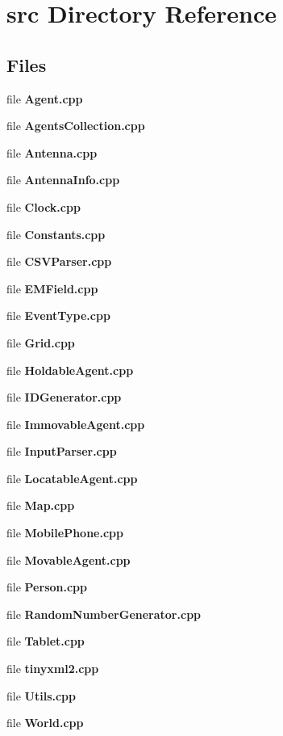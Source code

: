 \section{src Directory Reference}
\label{dir_68267d1309a1af8e8297ef4c3efbcdba}
\subsection*{Files}
\begin{DoxyCompactItemize}
\item 
file \textbf{ Agent.\+cpp}
\item 
file \textbf{ Agents\+Collection.\+cpp}
\item 
file \textbf{ Antenna.\+cpp}
\item 
file \textbf{ Antenna\+Info.\+cpp}
\item 
file \textbf{ Clock.\+cpp}
\item 
file \textbf{ Constants.\+cpp}
\item 
file \textbf{ C\+S\+V\+Parser.\+cpp}
\item 
file \textbf{ E\+M\+Field.\+cpp}
\item 
file \textbf{ Event\+Type.\+cpp}
\item 
file \textbf{ Grid.\+cpp}
\item 
file \textbf{ Holdable\+Agent.\+cpp}
\item 
file \textbf{ I\+D\+Generator.\+cpp}
\item 
file \textbf{ Immovable\+Agent.\+cpp}
\item 
file \textbf{ Input\+Parser.\+cpp}
\item 
file \textbf{ Locatable\+Agent.\+cpp}
\item 
file \textbf{ Map.\+cpp}
\item 
file \textbf{ Mobile\+Phone.\+cpp}
\item 
file \textbf{ Movable\+Agent.\+cpp}
\item 
file \textbf{ Person.\+cpp}
\item 
file \textbf{ Random\+Number\+Generator.\+cpp}
\item 
file \textbf{ Tablet.\+cpp}
\item 
file \textbf{ tinyxml2.\+cpp}
\item 
file \textbf{ Utils.\+cpp}
\item 
file \textbf{ World.\+cpp}
\end{DoxyCompactItemize}

